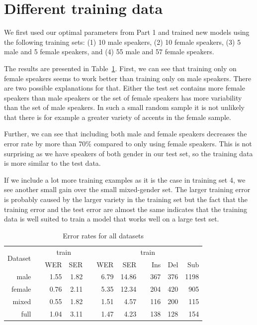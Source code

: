 \documentclass[twocolumn, 11pt]{article}
\begin{document}
\section{Different training data}

We first used our optimal parameters from Part 1 and trained new models using
the following training sets:  (1) 10 male speakers, (2)  10 female speakers, (3) 5 male and 5 female speakers, and (4) 55 male and 57 female speakers.

The results are presented in Table~\ref{tab:wer-all}\@. First, we can see that training only
on female speakers seems to work better than training only on male speakers.
There are two possible explanations for that. Either the test set contains
more female speakers than male speakers or the set of female speakers has more
variability than the set of male speakers. In such a small random sample it is
not unlikely that there is for example a greater variety of accents in the
female sample.

Further, we can see that including both male and female speakers decreases the
error rate by more than 70\% compared to only using female speakers. This is not
surprising as we have speakers of both gender in our test set, so the training
data is more similar to the test data.

If we include a lot more training examples as it is the case in training set 4,
we see another small gain over the small mixed-gender set. The larger training
error is probably caused by the larger variety in the training set but the fact
that the training error and the test error are almost the same indicates that
the training data is well suited to train a model that works well on a large
test set.

\begin{table}\centering
  \begin{tabular}{@{}rcrrcrrcrrr@{}}\toprule%
    \multirow{2}{*}{Dataset} & \phantom{a} & \multicolumn{2}{c}{train}
    & \phantom{a} & \multicolumn{6}{c}{train} \\
    \cmidrule{3-4} \cmidrule{6-11}
    && WER & SER && WER & SER && Ins & Del & Sub\\ \midrule%
    male && 1.55 & 1.82 && 6.79 & 14.86 && 367 & 376 & 1198\\
    female && 0.76 & 2.11 && 5.35 & 12.34 && 204 & 420 & 905\\
    mixed && 0.55 & 1.82 && 1.51 & 4.57 && 116 & 200 & 115\\
    full && 1.04 & 3.11 && 1.47 & 4.23 && 138 & 128 & 154\\
    \bottomrule
  \end{tabular}
  \caption{Error rates for all datasets}\label{tab:wer-all}
\end{table}
\end{document}
